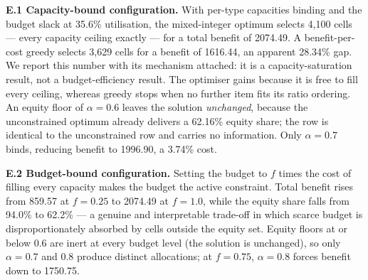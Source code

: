 \textbf{E.1 Capacity-bound configuration.} With per-type capacities binding and the budget slack at 35.6\%
utilisation, the mixed-integer optimum selects 4,100 cells --- every capacity ceiling exactly --- for a
total benefit of 2074.49. A benefit-per-cost greedy selects 3,629 cells for a benefit of 1616.44, an
apparent 28.34\% gap. We report this number with its mechanism attached: it is a capacity-saturation
result, not a budget-efficiency result. The optimiser gains because it is free to fill every ceiling,
whereas greedy stops when no further item fits its ratio ordering. An equity floor of
\(\alpha = 0.6\) leaves the solution \emph{unchanged}, because the unconstrained optimum already delivers a
62.16\% equity share; the row is identical to the unconstrained row and carries no information. Only
\(\alpha = 0.7\) binds, reducing benefit to 1996.90, a 3.74\% cost.

\textbf{E.2 Budget-bound configuration.} Setting the budget to \(f\) times the cost of filling every capacity
makes the budget the active constraint. Total benefit rises from 859.57 at \(f = 0.25\) to 2074.49 at
\(f = 1.0\), while the equity share falls from 94.0\% to 62.2\% --- a genuine and interpretable trade-off in
which scarce budget is disproportionately absorbed by cells outside the equity set. Equity floors at or
below 0.6 are inert at every budget level (the solution is unchanged), so only \(\alpha = 0.7\) and 0.8
produce distinct allocations; at \(f = 0.75\), \(\alpha = 0.8\) forces benefit down to 1750.75.

